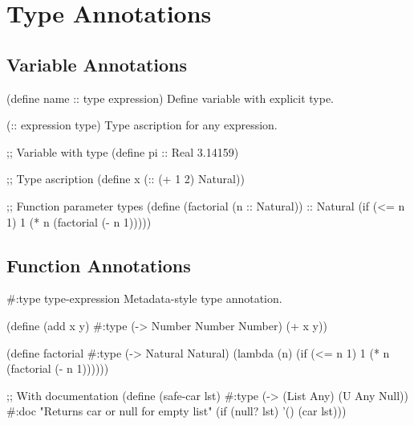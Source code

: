 \section{Type Annotations}
\label{sec:annotations}


\subsection{Variable Annotations}
\label{subsec:variable-annotations}

\begin{syntaxspec}{(define name :: type expression)}
Define variable with explicit type.
\end{syntaxspec}

\begin{syntaxspec}{(:: expression type)}
Type ascription for any expression.
\end{syntaxspec}

\begin{example}
\begin{lambdustcode}
;; Variable with type
(define pi :: Real 3.14159)

;; Type ascription
(define x (:: (+ 1 2) Natural))

;; Function parameter types
(define (factorial (n :: Natural)) :: Natural
  (if (<= n 1) 1 (* n (factorial (- n 1)))))
\end{lambdustcode}
\end{example}

\subsection{Function Annotations}
\label{subsec:function-annotations}

\begin{syntaxspec}{\#:type type-expression}
Metadata-style type annotation.
\end{syntaxspec}

\begin{example}
\begin{lambdustcode}
(define (add x y)
  #:type (-> Number Number Number)
  (+ x y))

(define factorial
  #:type (-> Natural Natural)  
  (lambda (n)
    (if (<= n 1) 1 (* n (factorial (- n 1))))))

;; With documentation
(define (safe-car lst)
  #:type (-> (List Any) (U Any Null))
  #:doc "Returns car or null for empty list"
  (if (null? lst) '() (car lst)))
\end{lambdustcode}
\end{example}


